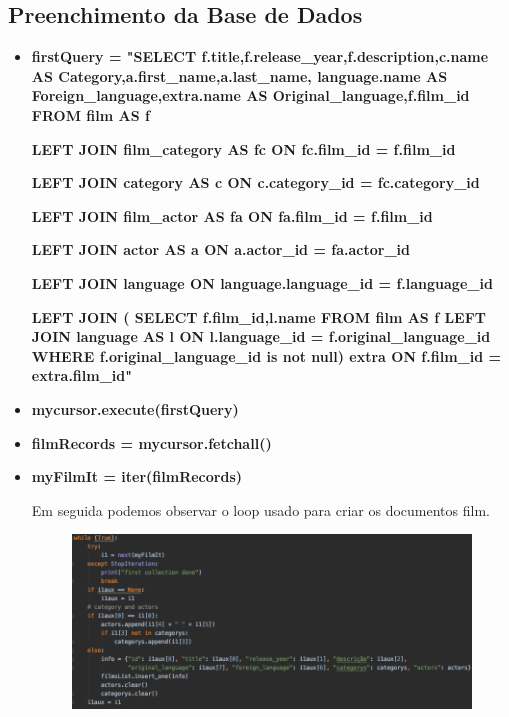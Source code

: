 \subsection{Preenchimento da Base de Dados}

\begin{itemize}
\item \textbf{firstQuery = "SELECT f.title,f.release\_year,f.description,c.name AS Category,a.first\_name,a.last\_name, language.name AS Foreign\_language,extra.name AS Original\_language,f.film\_id FROM film AS f} 
\par \textbf{LEFT JOIN film\_category AS fc ON fc.film\_id = f.film\_id }
\par \textbf{LEFT JOIN category AS c ON c.category\_id = fc.category\_id }
\par \textbf{LEFT JOIN film\_actor AS fa ON fa.film\_id = f.film\_id }
\par \textbf{LEFT JOIN actor AS a ON a.actor\_id = fa.actor\_id }
\par \textbf{LEFT JOIN language ON language.language\_id = f.language\_id} 
\par \textbf{LEFT JOIN ( SELECT f.film\_id,l.name FROM film AS f 
               LEFT JOIN language AS l ON l.language\_id = f.original\_language\_id 
               WHERE f.original\_language\_id is not null) 
           extra ON f.film\_id = extra.film\_id"}\newline

\item \textbf{mycursor.execute(firstQuery)}\newline
\item \textbf{filmRecords = mycursor.fetchall()}\newline
\item \textbf{myFilmIt = iter(filmRecords)}\newline

\par Em seguida podemos observar o loop usado para criar os documentos film.\newline
\begin{figure}[H]

  \centering

  \includegraphics[scale = 0.45]{ciclo.png}


\end{figure}
\end{itemize}
